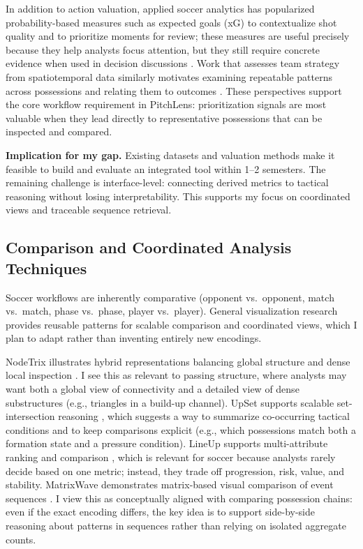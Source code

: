 \documentclass{vgtc}                          %
\begin{document}
In addition to action valuation, applied soccer analytics has popularized probability-based
measures such as expected goals (xG) to contextualize shot quality and to prioritize moments
for review; these measures are useful precisely because they help analysts focus attention, but
they still require concrete evidence when used in decision discussions \cite{Spearman2018BeyondGoals}.
Work that assesses team strategy from spatiotemporal data similarly motivates examining repeatable
patterns across possessions and relating them to outcomes \cite{Lucey2013Quality}. These perspectives
support the core workflow requirement in PitchLens: prioritization signals are most valuable when they
lead directly to representative possessions that can be inspected and compared.

\textbf{Implication for my gap.}
Existing datasets and valuation methods make it feasible to build and evaluate an integrated tool
within 1--2 semesters. The remaining challenge is interface-level: connecting derived metrics to
tactical reasoning without losing interpretability. This supports my focus on coordinated views and
traceable sequence retrieval.

\subsection{Comparison and Coordinated Analysis Techniques}
Soccer workflows are inherently comparative (opponent vs.\ opponent, match vs.\ match, phase vs.\ phase,
player vs.\ player). General visualization research provides reusable patterns for scalable comparison
and coordinated views, which I plan to adapt rather than inventing entirely new encodings.

NodeTrix illustrates hybrid representations balancing global structure and dense local inspection
\cite{Henry2007NodeTrix}. I see this as relevant to passing structure, where analysts may want both a
global view of connectivity and a detailed view of dense substructures (e.g., triangles in a build-up channel).
UpSet supports scalable set-intersection reasoning \cite{Lex2014UpSet}, which suggests a way to summarize
co-occurring tactical conditions and to keep comparisons explicit (e.g., which possessions match both a
formation state and a pressure condition). LineUp supports multi-attribute ranking and comparison
\cite{Gratzl2013LineUp}, which is relevant for soccer because analysts rarely decide based on one metric;
instead, they trade off progression, risk, value, and stability. MatrixWave demonstrates matrix-based visual
comparison of event sequences \cite{Zhao2015MatrixWave}. I view this as conceptually aligned with comparing
possession chains: even if the exact encoding differs, the key idea is to support side-by-side reasoning about
patterns in sequences rather than relying on isolated aggregate counts.
\end{document}
